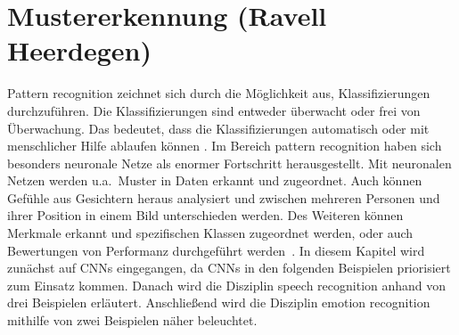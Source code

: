 \section{Mustererkennung (Ravell Heerdegen)} \label{Mustererkennung}
Pattern recognition zeichnet sich durch die Möglichkeit aus, Klassifizierungen durchzuführen. Die Klassifizierungen sind entweder überwacht oder frei von Überwachung. Das bedeutet, dass die Klassifizierungen automatisch oder mit menschlicher Hilfe ablaufen können \cite{svmgmm}. Im Bereich pattern recognition haben sich besonders neuronale Netze als enormer Fortschritt herausgestellt. Mit neuronalen Netzen werden u.a.~Muster in Daten erkannt und zugeordnet. Auch können Gefühle aus Gesichtern heraus analysiert und zwischen mehreren Personen und ihrer Position in einem Bild unterschieden werden. Des Weiteren können Merkmale erkannt und spezifischen Klassen zugeordnet werden, oder auch Bewertungen von Performanz durchgeführt werden~\cite{patternrec}.
In diesem Kapitel wird zunächst auf CNNs eingegangen, da CNNs in den folgenden Beispielen priorisiert zum Einsatz kommen. Danach wird die Disziplin speech recognition anhand von drei Beispielen erläutert. Anschließend wird die Disziplin emotion recognition mithilfe von zwei Beispielen näher beleuchtet.
\\
